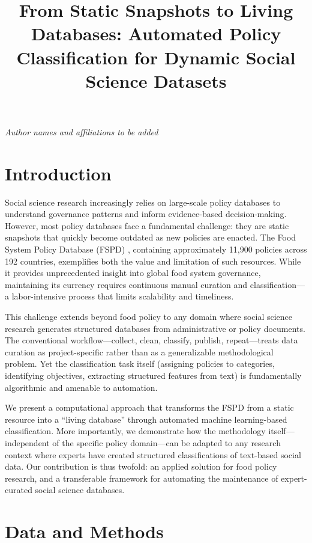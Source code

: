 \documentclass[a4paper,12pt]{article}
\title{From Static Snapshots to Living Databases: Automated Policy Classification for Dynamic Social Science Datasets}
\date{}
\begin{document}
\maketitle
\thispagestyle{fancy}

\begin{center}
\textit{Author names and affiliations to be added}
\end{center}

\section*{Introduction}

Social science research increasingly relies on large-scale policy databases to understand governance patterns and inform evidence-based decision-making. However, most policy databases face a fundamental challenge: they are static snapshots that quickly become outdated as new policies are enacted. The Food System Policy Database (FSPD) \cite{lowder2025}, containing approximately 11,900 policies across 192 countries, exemplifies both the value and limitation of such resources. While it provides unprecedented insight into global food system governance, maintaining its currency requires continuous manual curation and classification---a labor-intensive process that limits scalability and timeliness.

This challenge extends beyond food policy to any domain where social science research generates structured databases from administrative or policy documents. The conventional workflow---collect, clean, classify, publish, repeat---treats data curation as project-specific rather than as a generalizable methodological problem. Yet the classification task itself (assigning policies to categories, identifying objectives, extracting structured features from text) is fundamentally algorithmic and amenable to automation.

We present a computational approach that transforms the FSPD from a static resource into a ``living database'' through automated machine learning-based classification. More importantly, we demonstrate how the methodology itself---independent of the specific policy domain---can be adapted to any research context where experts have created structured classifications of text-based social data. Our contribution is thus twofold: an applied solution for food policy research, and a transferable framework for automating the maintenance of expert-curated social science databases.

\section*{Data and Methods}
\end{document}
